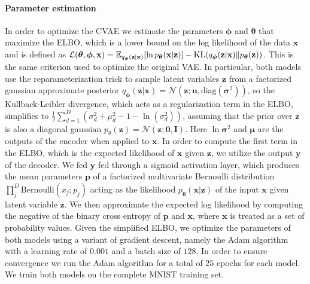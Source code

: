 \paragraph{Parameter estimation}
In order to optimize the CVAE we estimate the parameters $\bm{\phi}$ and $\bm{\theta}$ that maximize the ELBO, which is a lower bound on the log likelihood of the data $\mathbf{x}$ and is defined as $\mathcal{L}(\bm{\theta}, \bm{\phi}, \mathbf{x}) = \E_{q_{\bm{\phi}}(\mathbf{z}|\mathbf{x})}{\lrs{\ln{p_{\bm{\theta}}(\mathbf{x} |\mathbf{z} )}}} - \KL (q_{\bm{\phi}}(\mathbf{z}|\mathbf{x}) \lVert p_{\bm{\theta}}(\mathbf{z}) )$. This is the same criterion used to optimize the original VAE\@. In particular, both models use the reparameterization trick to sample latent variables $\mathbf{z}$ from a factorized gaussian approximate posterior $q_{\bm{\phi}}(\mathbf{z}|\mathbf{x}) = \mathcal{N}(\mathbf{z}; \mathbf{u}, \text{diag}(\bm{\sigma}^2))$, so the Kullback-Leibler divergence, which acts as a regularization term in the ELBO, simplifies to $\frac{1}{2}\sum_{d=1}^{D}(\sigma_d^2 + \mu_d^2 - 1 - \ln(\sigma_d^2))$, assuming that the prior over $\mathbf{z}$ is also a diagonal gaussian $p_{\theta}(\mathbf{z}) = \mathcal{N}(\mathbf{z};\mathbf{0}, \mathbf{I})$. Here $\ln{\bm{\sigma}^2}$ and $\bm{\mu}$ are the outputs of the encoder when applied to $\mathbf{x}$. In order to compute the first term in the ELBO, which is the expected likelihood of $\mathbf{x}$ given $\mathbf{z}$, we utilize the output $\mathbf{y}$ of the decoder. We fed $\mathbf{y}$ fed through a sigmoid activation layer, which produces the mean parameters $\mathbf{p}$ of a factorized multivariate Bernoulli distribution $\prod_j^{D} \text{Bernoulli}(x_j; p_j)$ acting as the likelihood $p_{\bm{\theta}}(\mathbf{x} |\mathbf{z} )$ of the input $\mathbf{x}$ given latent variable $\mathbf{z}$. \iffalse As such, one may regard both VAE models as making the simplifying assumption that the MNIST data is binary, which is not technically the case. The simplifying assumption is most likely warranted given that the vast majority of pixels in the MNIST dataset are in fact either $0$ or $1$. Given this simplification , \fi We then approximate  the expected log likelihood by computing the negative of the binary cross entropy of $\mathbf{p}$ and $\mathbf{x}$, where $\mathbf{x}$ is treated as a set of probability values. Given the simplified ELBO, we optimize the parameters of both models using a variant of gradient descent, namely the Adam algorithm with a learning rate of $0.001$ and a batch size of $128$. In order to ensure convergence we run the Adam algorithm for a total of $25$ epochs for each model. We train both models on the complete MNIST training set.


